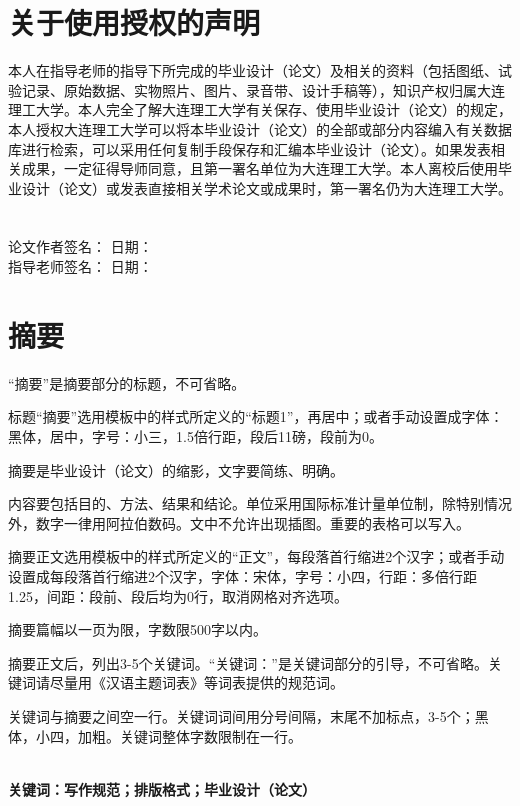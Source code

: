 \documentclass[UTF8,a4paper]{ctexart}
\numberwithin{table}{section}
\numberwithin{equation}{section}
\begin{document}
	\section*{\fontsize{22}{33} {\heiti 关于使用授权的声明}}
	{\fontsize{15pt}{22.5pt} 本人在指导老师的指导下所完成的毕业设计（论文）及相关的资料（包括图纸、试验记录、原始数据、实物照片、图片、录音带、设计手稿等），知识产权归属大连理工大学。本人完全了解大连理工大学有关保存、使用毕业设计（论文）的规定，本人授权大连理工大学可以将本毕业设计（论文）的全部或部分内容编入有关数据库进行检索，可以采用任何复制手段保存和汇编本毕业设计（论文）。如果发表相关成果，一定征得导师同意，且第一署名单位为大连理工大学。本人离校后使用毕业设计（论文）或发表直接相关学术论文或成果时，第一署名仍为大连理工大学。
	~\\
	~\\
	论文作者签名： \quad \quad \quad \quad \quad \quad 日\quad 期：\\
	指导老师签名： \quad \quad \quad \quad \quad \quad 日\quad 期：}
	\newpage
	\section*{\fontsize{15}{22.5} {\heiti 摘\quad\quad 要}}
	“摘要”是摘要部分的标题，不可省略。\par 
	标题“摘要”选用模板中的样式所定义的“标题1”，再居中；或者手动设置成字体：黑体，居中，字号：小三，1.5倍行距，段后11磅，段前为0。\par 
	摘要是毕业设计（论文）的缩影，文字要简练、明确。\par 
	内容要包括目的、方法、结果和结论。单位采用国际标准计量单位制，除特别情况外，数字一律用阿拉伯数码。文中不允许出现插图。重要的表格可以写入。\par 
	摘要正文选用模板中的样式所定义的“正文”，每段落首行缩进2个汉字；或者手动设置成每段落首行缩进2个汉字，字体：宋体，字号：小四，行距：多倍行距 1.25，间距：段前、段后均为0行，取消网格对齐选项。\par 
	摘要篇幅以一页为限，字数限500字以内。\par 
	摘要正文后，列出3-5个关键词。“关键词：”是关键词部分的引导，不可省略。关键词请尽量用《汉语主题词表》等词表提供的规范词。\par 
	关键词与摘要之间空一行。关键词词间用分号间隔，末尾不加标点，3-5个；黑体，小四，加粗。关键词整体字数限制在一行。\par 
	\quad \\
	{\bf{\heiti 关键词：写作规范；排版格式；毕业设计（论文）}}
	
\end{document}
